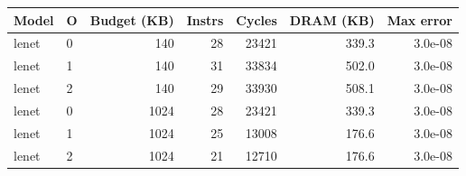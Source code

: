 \begin{tabular}{llrrrrr}
\toprule
Model & O & Budget (KB) & Instrs & Cycles & DRAM (KB) & Max error \\
\midrule
lenet & 0 & 140 & 28 & 23421 & 339.3 & 3.0e-08 \\
lenet & 1 & 140 & 31 & 33834 & 502.0 & 3.0e-08 \\
lenet & 2 & 140 & 29 & 33930 & 508.1 & 3.0e-08 \\
lenet & 0 & 1024 & 28 & 23421 & 339.3 & 3.0e-08 \\
lenet & 1 & 1024 & 25 & 13008 & 176.6 & 3.0e-08 \\
lenet & 2 & 1024 & 21 & 12710 & 176.6 & 3.0e-08 \\
\bottomrule
\end{tabular}
